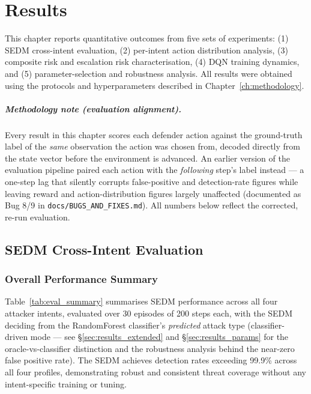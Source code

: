 \chapter{Results}
\label{ch:results}

This chapter reports quantitative outcomes from five sets of experiments:
(1) SEDM cross-intent evaluation,
(2) per-intent action distribution analysis,
(3) composite risk and escalation risk characterisation,
(4) DQN training dynamics, and
(5) parameter-selection and robustness analysis.
All results were obtained using the protocols and hyperparameters described
in Chapter~\ref{ch:methodology}.

\paragraph{Methodology note (evaluation alignment).} Every result in this
chapter scores each defender action against the ground-truth label of the
\emph{same} observation the action was chosen from, decoded directly from
the state vector before the environment is advanced. An earlier version of
the evaluation pipeline paired each action with the \emph{following} step's
label instead — a one-step lag that silently corrupts false-positive and
detection-rate figures while leaving reward and action-distribution figures
largely unaffected (documented as Bug 8/9 in \texttt{docs/BUGS\_AND\_FIXES.md}).
All numbers below reflect the corrected, re-run evaluation.

\section{SEDM Cross-Intent Evaluation}
\label{sec:results_sedm}

\subsection{Overall Performance Summary}

Table~\ref{tab:eval_summary} summarises SEDM performance across all four
attacker intents, evaluated over 30 episodes of 200 steps each, with the
SEDM deciding from the RandomForest classifier's \emph{predicted} attack
type (classifier-driven mode — see \S\ref{sec:results_extended} and
\S\ref{sec:results_params} for the oracle-vs-classifier distinction and the
robustness analysis behind the near-zero false positive rate).
The SEDM achieves detection rates exceeding 99.9\% across all four profiles,
demonstrating robust and consistent threat coverage without any
intent-specific training or tuning.

